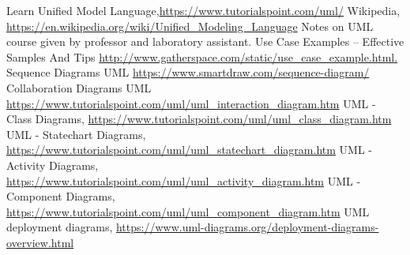 \begin{thebibliography}{99999}
\singlespace\normalsize

 Learn Unified Model Language,\url{https://www.tutorialspoint.com/uml/}
 Wikipedia, \url{https://en.wikipedia.org/wiki/Unified_Modeling_Language}
 Notes on UML course given by professor and laboratory assistant.
 Use Case Examples -- Effective Samples And Tips \url{http://www.gatherspace.com/static/use_case_example.html.}
 Sequence Diagrams UML \url{https://www.smartdraw.com/sequence-diagram/}
 Collaboration Diagrams UML \url{https://www.tutorialspoint.com/uml/uml_interaction_diagram.htm}
 UML - Class Diagrams, \url{https://www.tutorialspoint.com/uml/uml_class_diagram.htm}
 UML - Statechart Diagrams, \url{https://www.tutorialspoint.com/uml/uml_statechart_diagram.htm}
UML - Activity Diagrams, \url{https://www.tutorialspoint.com/uml/uml_activity_diagram.htm}
UML - Component Diagrams, \url{https://www.tutorialspoint.com/uml/uml_component_diagram.htm}
UML deployment diagrams, \url{https://www.uml-diagrams.org/deployment-diagrams-overview.html}




\end{thebibliography}
